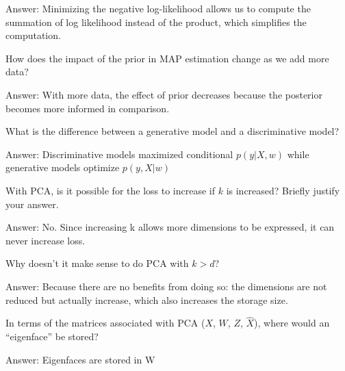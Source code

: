 \documentclass{article}
\def\ans#1{\par\gre{Answer: #1}}
\def\gre#1{{\color{gre}#1}}
\begin{document}
{\ans{Minimizing the negative log-likelihood allows us to compute the summation of log likelihood instead of the product, which simplifies the computation.}
\item How does the impact of the prior in MAP estimation change as we add more data?
\ans{With more data, the effect of prior decreases because the posterior becomes more informed in comparison.}
\item What is the difference between a generative model and a discriminative model?
\ans{Discriminative models maximized conditional $p(y | X, w)$ while generative models optimize $p(y, X | w)$}
\item With PCA, is it possible for the loss to increase if $k$ is increased? Briefly justify your answer.
\ans{No. Since increasing k allows more dimensions to be expressed, it can never increase loss.}
\item Why doesn't it make sense to do PCA with $k > d$?
\ans{Because there are no benefits from doing so: the dimensions are not reduced but actually increase, which also increases the storage size.}
\item In terms of the matrices associated with PCA ($X$, $W$, $Z$, $\hat{X}$), where would an ``eigenface'' be stored?
\ans{Eigenfaces are stored in W}
}
\end{document}
